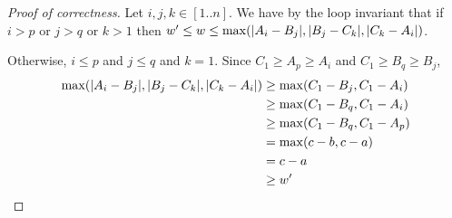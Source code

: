 \documentclass[12pt]{article}
\begin{document}
\begin{solution}
\begin{enumerate}[wide]
\begin{proof}[Proof of correctness]
                Let $i, j, k \in [1..n]$.
                We have by the loop invariant that if $i > p$ or $j > q$ or
                $k > 1$ then
                $w' \leq w \leq \max(\abs{A_{i} - B_{j}}, \abs{B_{j} - C_{k}}, \abs{C_{k} - A_{i}})$.

                Otherwise, $i \leq p$ and $j \leq q$ and $k = 1$.
                Since $C_{1} \geq A_{p} \geq A_{i}$ and $C_{1} \geq B_{q} \geq B_{j}$,
                \begin{align*}
                    \max(\abs{A_{i} - B_{j}}, \abs{B_{j} - C_{k}}, \abs{C_{k} - A_{i}})
                        &\geq \max(C_{1} - B_{j}, C_{1} - A_{i}) \\
                        &\geq \max(C_{1} - B_{q}, C_{1} - A_{i}) \\
                        &\geq \max(C_{1} - B_{q}, C_{1} - A_{p}) \\
                        &= \max(c - b, c - a) \\
                        &= c - a \\
                        &\geq w'
                \end{align*}
                

\end{proof}
\end{enumerate}
\end{solution}
\end{document}
